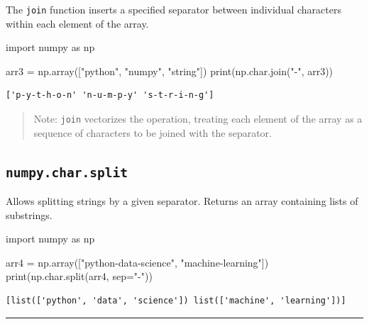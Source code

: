 \documentclass[
  english,
  letterpaper,
  DIV=11,
  numbers=noendperiod]{scrreprt}
\newenvironment{Shaded}{\begin{snugshade}}{\end{snugshade}}
\newcommand{\BuiltInTok}[1]{\textcolor[rgb]{0.00,0.23,0.31}{#1}}
\newcommand{\ImportTok}[1]{\textcolor[rgb]{0.00,0.46,0.62}{#1}}
\newcommand{\NormalTok}[1]{\textcolor[rgb]{0.00,0.23,0.31}{#1}}
\newcommand{\OperatorTok}[1]{\textcolor[rgb]{0.37,0.37,0.37}{#1}}
\newcommand{\StringTok}[1]{\textcolor[rgb]{0.13,0.47,0.30}{#1}}
\begin{document}
The \texttt{join} function inserts a specified separator between
individual characters within each element of the array.

\begin{Shaded}
\begin{Highlighting}[]
\ImportTok{import}\NormalTok{ numpy }\ImportTok{as}\NormalTok{ np}

\NormalTok{arr3 }\OperatorTok{=}\NormalTok{ np.array([}\StringTok{"python"}\NormalTok{, }\StringTok{"numpy"}\NormalTok{, }\StringTok{"string"}\NormalTok{])}
\BuiltInTok{print}\NormalTok{(np.char.join(}\StringTok{"{-}"}\NormalTok{, arr3))}
\end{Highlighting}
\end{Shaded}

\begin{verbatim}
['p-y-t-h-o-n' 'n-u-m-p-y' 's-t-r-i-n-g']
\end{verbatim}

\begin{quote}
Note: \texttt{join} vectorizes the operation, treating each element of
the array as a sequence of characters to be joined with the separator.
\end{quote}

\subsection{\texorpdfstring{\texttt{numpy.char.split}}{numpy.char.split}}\label{numpy.char.split}

Allows splitting strings by a given separator. Returns an array
containing lists of substrings.

\begin{Shaded}
\begin{Highlighting}[]
\ImportTok{import}\NormalTok{ numpy }\ImportTok{as}\NormalTok{ np}

\NormalTok{arr4 }\OperatorTok{=}\NormalTok{ np.array([}\StringTok{"python{-}data{-}science"}\NormalTok{, }\StringTok{"machine{-}learning"}\NormalTok{])}
\BuiltInTok{print}\NormalTok{(np.char.split(arr4, sep}\OperatorTok{=}\StringTok{"{-}"}\NormalTok{))}
\end{Highlighting}
\end{Shaded}

\begin{verbatim}
[list(['python', 'data', 'science']) list(['machine', 'learning'])]
\end{verbatim}

\begin{center}\rule{0.5\linewidth}{0.5pt}\end{center}
\end{document}

